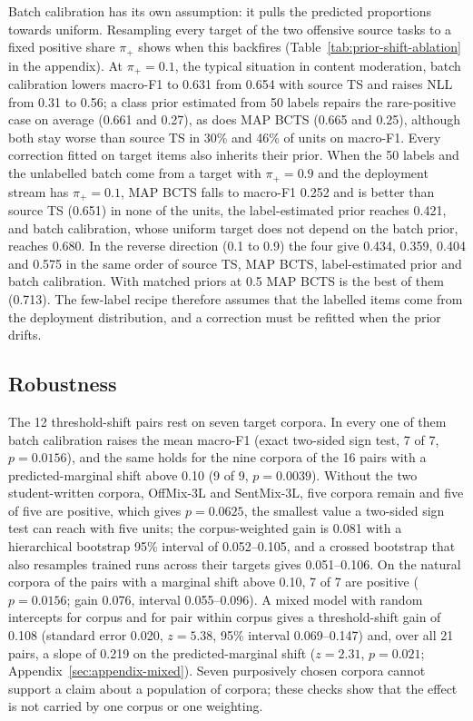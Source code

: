 Batch calibration has its own assumption: it pulls the predicted proportions towards uniform. Resampling every target
of the two offensive source tasks to a fixed positive share $\pi_+$ shows when this backfires
(Table~\ref{tab:prior-shift-ablation} in the appendix). At $\pi_+ = 0.1$, the typical situation in content moderation,
batch calibration lowers macro-F1 to 0.631 from 0.654 with source TS and raises NLL from 0.31 to 0.56; a class prior
estimated from 50 labels repairs the rare-positive case on average (0.661 and 0.27), as does MAP BCTS (0.665 and
0.25), although both stay worse than source TS in 30\% and 46\% of units on macro-F1. Every correction fitted on
target items also inherits their prior. When the 50 labels and the unlabelled batch come from a target with
$\pi_+ = 0.9$ and the deployment stream has $\pi_+ = 0.1$, MAP BCTS falls to macro-F1 0.252 and is better than source
TS (0.651) in none of the units, the label-estimated prior reaches 0.421, and batch calibration, whose uniform target
does not depend on the batch prior, reaches 0.680. In the reverse direction (0.1 to 0.9) the four give 0.434, 0.359,
0.404 and 0.575 in the same order of source TS, MAP BCTS, label-estimated prior and batch calibration. With matched
priors at 0.5 MAP BCTS is the best of them (0.713). The few-label recipe therefore assumes that the labelled items come
from the deployment distribution, and a correction must be refitted when the prior drifts.

\subsection{Robustness}
\label{sec:results-robustness}

The 12 threshold-shift pairs rest on seven target corpora. In every one of them batch calibration raises the mean
macro-F1 (exact two-sided sign test, 7 of 7, $p = 0.0156$), and the same holds for the nine corpora of the 16 pairs
with a predicted-marginal shift above 0.10 (9 of 9, $p = 0.0039$). Without the two student-written corpora, OffMix-3L
and SentMix-3L, five corpora remain and five of five are positive, which gives $p = 0.0625$, the smallest value a
two-sided sign test can reach with five units; the corpus-weighted gain is 0.081 with a hierarchical bootstrap 95\%
interval of 0.052--0.105, and a crossed bootstrap that also resamples trained runs across their targets gives
0.051--0.106. On the natural corpora of the pairs with a marginal shift above 0.10, 7 of 7 are positive
($p = 0.0156$; gain 0.076, interval 0.055--0.096). A mixed model with random intercepts for corpus and for pair within
corpus gives a threshold-shift gain of 0.108 (standard error 0.020, $z = 5.38$, 95\% interval 0.069--0.147) and, over
all 21 pairs, a slope of 0.219 on the predicted-marginal shift ($z = 2.31$, $p = 0.021$;
Appendix~\ref{sec:appendix-mixed}). Seven purposively chosen corpora cannot support a claim about a population of
corpora; these checks show that the effect is not carried by one corpus or one weighting.
